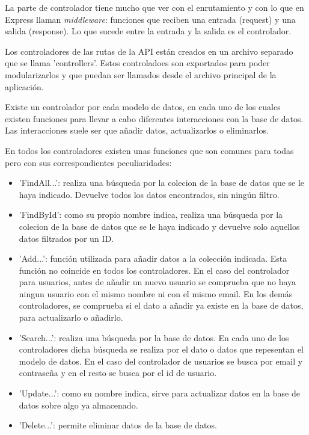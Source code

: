 \documentclass[a4paper, 12pt]{book}
\begin{document}
La parte de controlador tiene mucho que ver con el enrutamiento y con lo que en Express llaman \emph{middleware}: funciones que reciben una entrada (request) y una salida (response). Lo que sucede entre la entrada y la salida es el controlador.

Los controladores de las rutas de la API est\'an creados en un archivo separado que se llama 'controllers'. Estos controladoes son exportados para poder modularizarlos y que puedan ser llamados desde el archivo principal de la aplicaci\'on. 

Existe un controlador por cada modelo de datos, en cada uno de los cuales existen funciones para llevar a cabo diferentes interacciones con la base de datos. Las interacciones suele ser que a\~nadir datos, actualizarlos o eliminarlos.

En todos los controladores existen unas funciones que son comunes para todas pero con sus correspondientes peculiaridades:

\begin{itemize}
\item 'FindAll...': realiza una b\'usqueda por la colecion de la base de datos que se le haya indicado. Devuelve todos los datos encontrados, sin ning\'un filtro.

\item 'FindById': como su propio nombre indica, realiza una b\'usqueda por la colecion de la base de datos que se le haya indicado y devuelve solo aquellos datos filtrados por un ID.

\item 'Add...': funci\'on utilizada para a\~nadir datos a la colecci\'on indicada. Esta funci\'on no coincide en todos los controladores. En el caso del controlador para usuarios, antes de a\~nadir un nuevo usuario se comprueba que no haya ningun usuario con el mismo nombre ni con el mismo email. En los dem\'as controladores, se comprueba si el dato a a\~nadir ya existe en la base de datos, para actualizarlo o a\~nadirlo.

\item 'Search...': realiza una b\'usqueda por la base de datos. En cada uno de los controladores dicha b\'usqueda se realiza por el dato o datos que repesentan el modelo de datos. En el caso del controlador de usuarios se busca por email y contrase\~na y en el resto se busca por el id de usuario.

\item 'Update...': como su nombre indica, sirve para actualizar datos en la base de datos sobre algo ya almacenado.

\item 'Delete...': permite eliminar datos de la base de datos.

\end{itemize}
\end{document}
